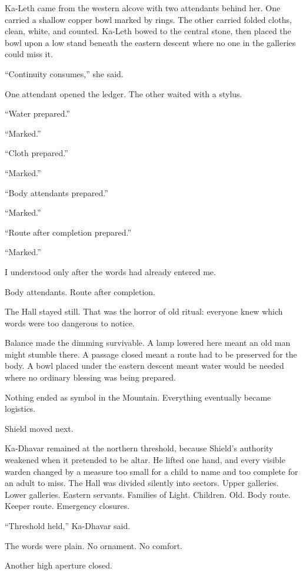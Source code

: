 Ka-Leth came from the western alcove with two attendants behind her.
One carried a shallow copper bowl marked by rings.
The other carried folded cloths, clean, white, and counted.
Ka-Leth bowed to the central stone, then placed the bowl upon a low stand beneath the eastern descent where no one in the galleries could miss it.\par
``Continuity consumes,'' she said.\par
One attendant opened the ledger.
The other waited with a stylus.\par
``Water prepared.''\par
``Marked.''\par
``Cloth prepared.''\par
``Marked.''\par
``Body attendants prepared.''\par
``Marked.''\par
``Route after completion prepared.''\par
``Marked.''\par
I understood only after the words had already entered me.\par
Body attendants.
Route after completion.\par
The Hall stayed still.
That was the horror of old ritual: everyone knew which words were too dangerous to notice.\par
Balance made the dimming survivable.
A lamp lowered here meant an old man might stumble there.
A passage closed meant a route had to be preserved for the body.
A bowl placed under the eastern descent meant water would be needed where no ordinary blessing was being prepared.\par
Nothing ended as symbol in the Mountain.
Everything eventually became logistics.\par
Shield moved next.\par
Ka-Dhavar remained at the northern threshold, because Shield's authority weakened when it pretended to be altar.
He lifted one hand, and every visible warden changed by a measure too small for a child to name and too complete for an adult to miss.
The Hall was divided silently into sectors.
Upper galleries.
Lower galleries.
Eastern servants.
Families of Light.
Children.
Old.
Body route.
Keeper route.
Emergency closures.\par
``Threshold held,'' Ka-Dhavar said.\par
The words were plain.
No ornament.
No comfort.\par
Another high aperture closed.\par
